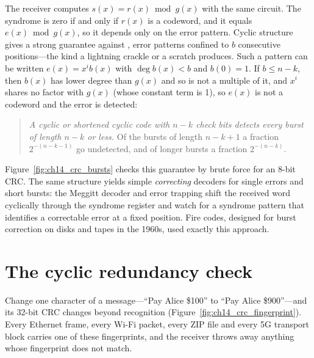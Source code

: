 The receiver computes $s(x)=r(x)\bmod g(x)$ with the same circuit. The syndrome is zero if and
only if $r(x)$ is a codeword, and it equals $e(x)\bmod g(x)$, so it depends only on the error
pattern. Cyclic structure gives a strong guarantee against , error patterns
confined to $b$ consecutive positions---the kind a lightning crackle or a scratch produces. Such a
pattern can be written $e(x)=x^ib(x)$ with $\deg b(x)<b$ and $b(0)=1$. If $b\le n-k$, then $b(x)$ has
lower degree than $g(x)$ and so is not a multiple of it, and $x^i$ shares no factor with $g(x)$ (whose
constant term is 1), so $e(x)$ is not a codeword and the error is detected:
\begin{quote}
\emph{A cyclic or shortened cyclic code with $n-k$ check bits detects every burst of length
$n-k$ or less.} Of the bursts of length $n-k+1$ a fraction $2^{-(n-k-1)}$ go undetected, and of
longer bursts a fraction $2^{-(n-k)}$.
\end{quote}
Figure~\ref{fig:ch14_crc_bursts} checks this guarantee by brute force for an 8-bit CRC. The same
structure yields simple \emph{correcting} decoders for single errors and short bursts: the Meggitt
decoder and error trapping shift the received word cyclically through the syndrome register and
watch for a syndrome pattern that identifies a correctable error at a fixed position. Fire codes,
designed for burst correction on disks and tapes in the 1960s, used exactly this approach.

\section{The cyclic redundancy check}
\label{sec:ch14:crc}

Change one character of a message---``Pay Alice \$100'' to ``Pay Alice \$900''---and its 32-bit CRC
changes beyond recognition (Figure~\ref{fig:ch14_crc_fingerprint}). Every Ethernet frame, every Wi-Fi
packet, every ZIP file and every 5G transport block carries one of these fingerprints, and the
receiver throws away anything whose fingerprint does not match.


